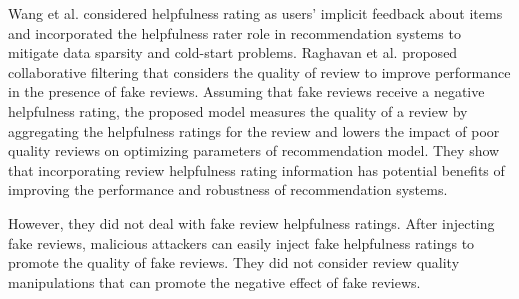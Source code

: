 \documentclass[master,english,final]{kaist-ucs}
\begin{document}
Wang et al. \cite{DualRole} considered helpfulness rating as users’ implicit feedback about items and incorporated the helpfulness rater role in recommendation systems to mitigate data sparsity and cold-start problems.
Raghavan et al. \cite{RQMF} proposed collaborative filtering that considers the quality of review to improve performance in the presence of fake reviews.
Assuming that fake reviews receive a negative helpfulness rating, the proposed model measures the quality of a review by aggregating the helpfulness ratings for the review and lowers the impact of poor quality reviews on optimizing parameters of recommendation model.
They show that incorporating review helpfulness rating information has potential benefits of improving the performance and robustness of recommendation systems.

However, they did not deal with fake review helpfulness ratings.
After injecting fake reviews, malicious attackers can easily inject fake helpfulness ratings to promote the quality of fake reviews.
They did not consider review quality manipulations that can promote the negative effect of fake reviews.
\end{document}
